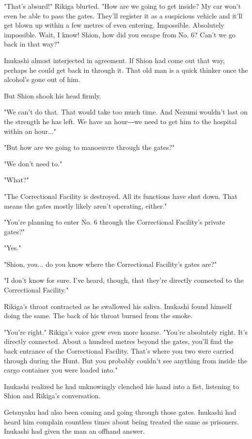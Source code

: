 "That's absurd!" Rikiga blurted. "How are we going to get inside? My car
won't even be able to pass the gates. They'll register it as a
suspicious vehicle and it'll get blown up within a few metres of even
entering. Impossible. Absolutely impossible. Wait, I know! Shion, how
did you escape from No. 6? Can't we go back in that way?"

Inukashi almost interjected in agreement. If Shion had come out that
way, perhaps he could get back in through it. That old man is a quick
thinker once the alcohol's gone out of him.

But Shion shook his head firmly.

"We can't do that. That would take too much time. And Nezumi wouldn't
last on the strength he has left. We have an hour―we need to get him to
the hospital within an hour..."

"But how are we going to manoeuvre through the gates?"

"We don't need to."

"What?"

"The Correctional Facility is destroyed. All its functions have shut
down. That means the gates mostly likely aren't operating, either."

"You're planning to enter No. 6 through the Correctional Facility's
private gates?"

"Yes."

"Shion, you... do you know where the Correctional Facility's gates are?"

"I don't know for sure. I've heard, though, that they're directly
connected to the Correctional Facility."

Rikiga's throat contracted as he swallowed his saliva. Inukashi found
himself doing the same. The back of his throat burned from the smoke.

"You're right." Rikiga's voice grew even more hoarse. "You're absolutely
right. It's directly connected. About a hundred metres beyond the gates,
you'll find the back entrance of the Correctional Facility. That's where
you two were carried through during the Hunt. But you probably couldn't
see anything from inside the cargo container you were loaded into."

Inukashi realized he had unknowingly clenched his hand into a fist,
listening to Shion and Rikiga's conversation.

Getsuyaku had also been coming and going through those gates. Inukashi
had heard him complain countless times about being treated the same as
prisoners. Inukashi had given the man an offhand answer.

